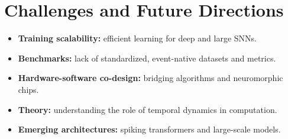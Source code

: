 \section{Challenges and Future Directions}
\label{sec:challenges}


\begin{itemize}[leftmargin=*]
  \item \textbf{Training scalability:} efficient learning for deep and large SNNs.
  \item \textbf{Benchmarks:} lack of standardized, event-native datasets and metrics.
  \item \textbf{Hardware-software co-design:} bridging algorithms and neuromorphic chips.
  \item \textbf{Theory:} understanding the role of temporal dynamics in computation.
  \item \textbf{Emerging architectures:} spiking transformers and large-scale models.
\end{itemize}
